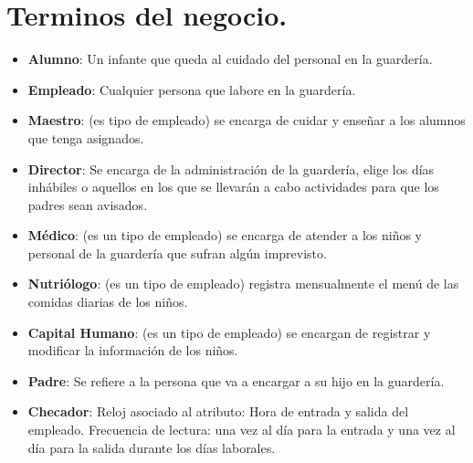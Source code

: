 \section{Terminos del negocio.}
\begin{itemize}
\item \textbf{Alumno}: Un infante que queda al cuidado del personal en la guardería.
\item \textbf{Empleado}: Cualquier persona que labore en la guardería.
\item \textbf{Maestro}: (es tipo de empleado) se encarga de cuidar y enseñar a los alumnos que tenga asignados.
\item \textbf{Director}: Se encarga de la administración de la guardería, elige los días inhábiles o aquellos en los que se llevarán a cabo actividades para que los padres sean avisados.
\item \textbf{Médico}: (es un tipo de empleado) se encarga de atender a los niños y personal de la guardería que sufran algún imprevisto.
\item \textbf{Nutriólogo}: (es un tipo de empleado) registra mensualmente el menú de las comidas diarias de los niños.
\item \textbf{Capital Humano}: (es un tipo de empleado) se encargan de registrar y modificar la información de los niños.
\item \textbf{Padre}: Se refiere a la persona que va a encargar a su hijo en la guardería.
\item \textbf{Checador}: Reloj asociado al atributo: Hora de entrada y salida del empleado. Frecuencia de lectura: una vez al día para la entrada y una vez al día para la salida durante los días laborales.
\end{itemize}